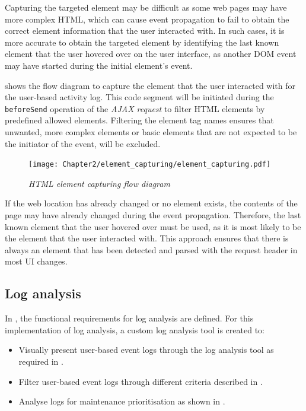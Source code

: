 Capturing the targeted element may be difficult as some web pages may have more complex HTML, which can cause event propagation to fail to obtain the correct element information that the user interacted with. In such cases, it is more accurate to obtain the targeted element by identifying the last known element that the user hovered over on the user interface, as another DOM event may have started during the initial element's event.\par {} shows the flow diagram to capture the element that the user interacted with for the user-based activity log. This code segment will be initiated during the \texttt{beforeSend} operation of the \textit{AJAX request} to filter HTML elements by predefined allowed elements. Filtering the element tag names ensures that unwanted, more complex elements or basic elements that are not expected to be the initiator of the event, will be excluded. 

\begin{figure}[!htb]
	\centering %
	\texttt{[image: Chapter2/element\_capturing/element\_capturing.pdf]}
	\caption[HTML element capturing flow diagram]
	{\textit{HTML element capturing flow diagram}}\label{fig:ch3_element_event_capturing}
\end{figure}

If the web location has already changed or no element exists, the contents of the page may have already changed during the event propagation. Therefore, the last known element that the user hovered over must be used, as it is most likely to be the element that the user interacted with. This approach ensures that there is always an element that has been detected and parsed with the request header in most UI changes.

\clearpage

\subsection{Log analysis}\label{sec:ch3_implementationLogAnalysis}
In , the functional requirements for log analysis are defined. For this implementation of log analysis, a custom log analysis tool is created to:

\begin{itemize}
\item Visually present user-based event logs through the log analysis tool as required in .
\item Filter user-based event logs through different criteria described in .
\item Analyse logs for maintenance prioritisation as shown in .
\end{itemize}

